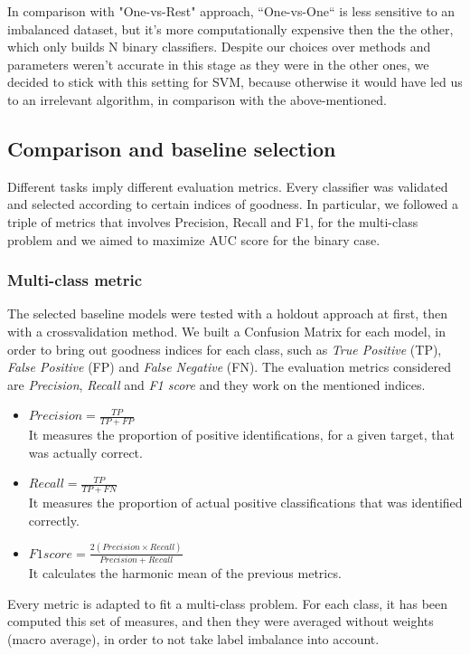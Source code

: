 In comparison with "One-vs-Rest" approach, ``One-vs-One`` is less sensitive to an imbalanced dataset, but it's more computationally expensive then the the other, which only builds N binary classifiers.
Despite our choices over methods and parameters weren't accurate in this stage as they were in the other ones, we decided to stick with this setting for SVM, because otherwise it would have led us to an irrelevant algorithm, in comparison with the above-mentioned.

\subsection{Comparison and baseline selection}
Different tasks imply different evaluation metrics. Every classifier was validated and selected according to certain indices of goodness. In particular, we followed a triple of metrics that involves Precision, Recall and F1, for the multi-class problem and we aimed to maximize AUC score for the binary case.
\subsubsection{Multi-class metric}
The selected baseline models were tested with a holdout approach at first, then with a crossvalidation method.
We built a Confusion Matrix for each model, in order to bring out goodness indices for each class, such as \textit{True Positive} (TP), \textit{False Positive} (FP) and \textit{False Negative} (FN).
The evaluation metrics considered are \textit{Precision}, \textit{Recall} and \textit{F1 score} and they work on the mentioned indices.
\begin{itemize}
	\item[\PencilRight] $ Precision = \frac{TP}{TP+FP} $\\
	It measures the proportion of positive identifications, for a given target, that was actually correct.
	\item[\PencilRight] $ Recall = \frac{TP}{TP+FN} $\\
	It measures the proportion of actual positive classifications that was identified correctly.
	\item[\PencilRight] $ F1 score = \frac{2(Precision \times Recall )}{Precision+Recall} $\\
	It calculates the harmonic mean of the previous metrics.
\end{itemize}
Every metric is adapted to fit a multi-class problem. For each class, it has been computed this set of measures, and then they were averaged without weights (macro average), in order to not take label imbalance into account.

